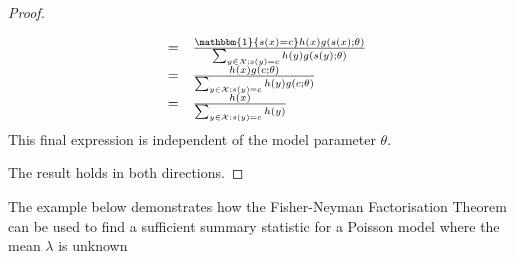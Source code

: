 \documentclass[11pt,a4paper,margin=0]{article}
\newcommand*{\indexed}{\mathbbm{1}}
\theoremstyle{break}
\begin{document}
\begin{box_theorem}
\begin{proof}
\begin{itemize}
\[\begin{array}{rcl}
          &=&\frac{\indexed\{s(x)=c\}h(x)g(s(x);\theta)}{\sum_{y\in\mathcal{X};s(y)=c}h(y)g(s(y);\theta)}\\
          &=&\frac{h(x)g(c;\theta)}{\sum_{y\in\mathcal{X};s(y)=c}h(y)g(c;\theta)}\\
          &=&\frac{h(x)}{\sum_{y\in\mathcal{X};s(y)=c}h(y)}
        \end{array}\]
        This final expression is independent of the model parameter $\theta$.
      \end{itemize}
      The result holds in both directions.
    \end{proof}
  \end{box_theorem}

  \par The example below demonstrates how the Fisher-Neyman Factorisation Theorem can be used to find a sufficient summary statistic for a Poisson model where the mean $\lambda$ is unknown
\end{document}
